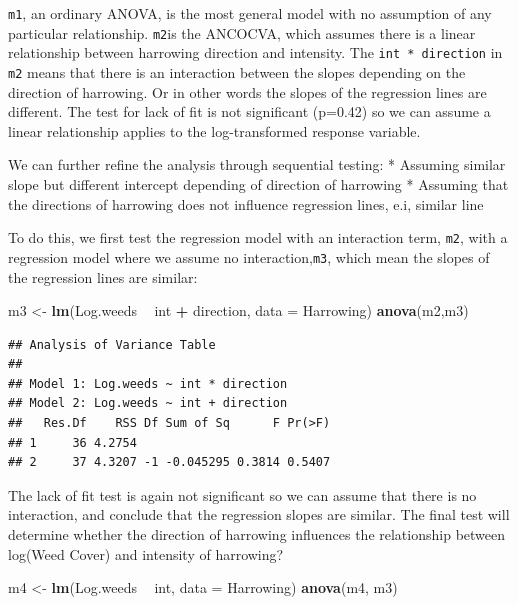 \documentclass[letterpaper,]{book}
\newenvironment{Shaded}{\begin{snugshade}}{\end{snugshade}}
\newcommand{\DataTypeTok}[1]{\textcolor[rgb]{0.13,0.29,0.53}{#1}}
\newcommand{\KeywordTok}[1]{\textcolor[rgb]{0.13,0.29,0.53}{\textbf{#1}}}
\newcommand{\NormalTok}[1]{#1}
\newcommand{\OperatorTok}[1]{\textcolor[rgb]{0.81,0.36,0.00}{\textbf{#1}}}
\newcommand{\StringTok}[1]{\textcolor[rgb]{0.31,0.60,0.02}{#1}}
\begin{document}
\texttt{m1}, an ordinary ANOVA, is the most general model with no assumption of any particular relationship. \texttt{m2}is the ANCOCVA, which assumes there is a linear relationship between harrowing direction and intensity. The \texttt{int\ *\ direction} in \texttt{m2} means that there is an interaction between the slopes depending on the direction of harrowing. Or in other words the slopes of the regression lines are different. The test for lack of fit is not significant (p=0.42) so we can assume a linear relationship applies to the log-transformed response variable.

We can further refine the analysis through sequential testing:
* Assuming similar slope but different intercept depending of direction of harrowing
* Assuming that the directions of harrowing does not influence regression lines, e.i, similar line

To do this, we first test the regression model with an interaction term, \texttt{m2}, with a regression model where we assume no interaction,\texttt{m3}, which mean the slopes of the regression lines are similar:

\begin{Shaded}
\begin{Highlighting}[]
\NormalTok{m3 <-}\StringTok{ }\KeywordTok{lm}\NormalTok{(Log.weeds }\OperatorTok{~}\StringTok{ }\NormalTok{int }\OperatorTok{+}\StringTok{ }\NormalTok{direction, }\DataTypeTok{data =}\NormalTok{ Harrowing)}
\KeywordTok{anova}\NormalTok{(m2,m3)}
\end{Highlighting}
\end{Shaded}

\begin{verbatim}
## Analysis of Variance Table
## 
## Model 1: Log.weeds ~ int * direction
## Model 2: Log.weeds ~ int + direction
##   Res.Df    RSS Df Sum of Sq      F Pr(>F)
## 1     36 4.2754                           
## 2     37 4.3207 -1 -0.045295 0.3814 0.5407
\end{verbatim}

The lack of fit test is again not significant so we can assume that there is no interaction, and conclude that the regression slopes are similar. The final test will determine whether the direction of harrowing influences the relationship between log(Weed Cover) and intensity of harrowing?

\begin{Shaded}
\begin{Highlighting}[]
\NormalTok{m4 <-}\StringTok{ }\KeywordTok{lm}\NormalTok{(Log.weeds }\OperatorTok{~}\StringTok{ }\NormalTok{int, }\DataTypeTok{data =}\NormalTok{ Harrowing)}
\KeywordTok{anova}\NormalTok{(m4, m3)}
\end{Highlighting}
\end{Shaded}
\end{document}

